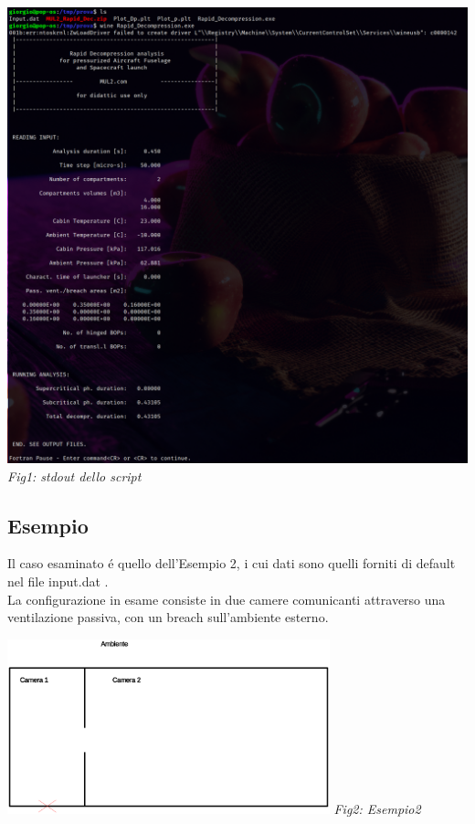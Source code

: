 \documentclass{article}
\begin{document}
    \begin{center}
        \includegraphics[width=\textwidth]{MUL2_feedback.png}\\
        \textit{Fig1: stdout dello script}
    \end{center}
    




    \pagebreak

        \subsection{Esempio}
        Il caso esaminato é quello dell'Esempio 2, i cui dati sono quelli
        forniti di default nel file input.dat .\\
        La configurazione in esame consiste in due camere comunicanti attraverso
        una ventilazione passiva, con un breach sull'ambiente esterno. 
        \begin{center}
            \includegraphics[width=0.7\textwidth]{ES1_Esempio2.eps}\linebreak
            \textit{Fig2: Esempio2}
        \end{center}
\end{document}
